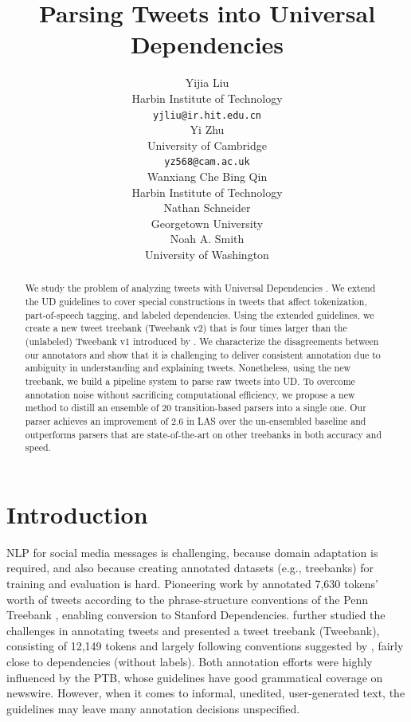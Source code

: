 \documentclass[11pt,a4paper]{article}
\title{Parsing Tweets into Universal Dependencies}
\author{Yijia Liu \\
  Harbin Institute of Technology \\
  {\tt yjliu@ir.hit.edu.cn} \\\And
  Yi Zhu \\
  University of Cambridge \\
  {\tt yz568@cam.ac.uk} \\\AND
  Wanxiang Che \quad Bing Qin\\
  Harbin Institute of Technology\\\And
  Nathan Schneider \\
  Georgetown University \\\And
  Noah A. Smith \\
  University of Washington
  }
\date{}
\begin{document}
\maketitle
\begin{abstract}
We study the problem of analyzing tweets with
Universal Dependencies \citep[UD;][]{NIVRE16.348}. We extend the UD guidelines to cover
special constructions in tweets that affect tokenization,
part-of-speech tagging, and labeled dependencies. Using the extended guidelines, we create
a new tweet treebank ({\sc Tweebank v2}) that is four times larger than the (unlabeled) {\sc Tweebank
  v1} introduced by \citet{kong-EtAl:2014:EMNLP2014}. 
We characterize the disagreements between our annotators
and show that it is challenging to deliver
consistent annotation due to ambiguity in
understanding and explaining tweets. Nonetheless, using the new treebank,
we build a pipeline system to parse raw tweets into UD. To overcome 
annotation noise without sacrificing computational efficiency, we propose a new
method to distill an ensemble of 20 transition-based parsers into a single one. Our
parser achieves an improvement of 2.6 in LAS over the un-ensembled baseline 
and outperforms parsers that are state-of-the-art on other treebanks in both accuracy and speed.
\end{abstract}

\section{Introduction}
NLP for social media messages is challenging, because domain
adaptation is required, and also because creating annotated datasets
(e.g., treebanks)
for training and evaluation is hard. 
Pioneering work by \citet{AAAIW113912} 
annotated 7,630 tokens' worth of tweets according to the
phrase-structure conventions of the Penn Treebank
\citep[PTB;][]{Marcus93buildinga}, enabling conversion to Stanford Dependencies.
\citet{kong-EtAl:2014:EMNLP2014} further studied the challenges in
annotating tweets and presented a tweet treebank ({\sc Tweebank}),
consisting of 12,149 tokens and largely following conventions
suggested by \citet{schneider-EtAl:2013:LAW7-ID}, fairly close to 
\citet{Yamada03statisticaldependency} dependencies (without labels). 
Both annotation efforts were highly influenced by the PTB, whose guidelines
have good grammatical coverage on newswire. However, when it comes
to informal, unedited, user-generated text, the guidelines may leave
many annotation decisions unspecified.
\end{document}

